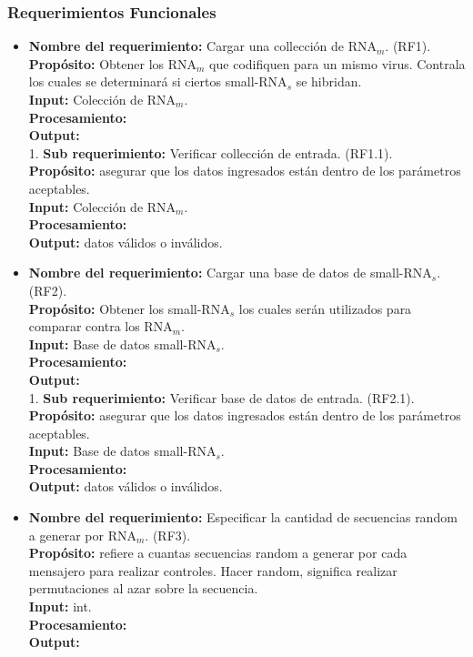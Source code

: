 \documentclass[12pt,a4paper,spanish]{article}
\begin{document}
	\subsubsection{Requerimientos Funcionales}
	\begin{itemize}
		\item \textbf{Nombre del requerimiento:} Cargar una collección de RNA$_m$. (RF1).\\
 	    \textbf{Propósito:} Obtener los RNA$_m$ que codifiquen para un mismo virus. Contrala los cuales se determinará si ciertos small-RNA$_s$ 								se hibridan.\\
		\textbf{Input:} Colección de RNA$_m$.\\
		\textbf{Procesamiento:} \\
		\textbf{Output:} \\

		1. \textbf{Sub requerimiento:} Verificar collección de entrada. (RF1.1).\\
 	    \textbf{Propósito:} asegurar que los datos ingresados están dentro de los parámetros aceptables. \\						
		\textbf{Input:} Colección de RNA$_m$.\\
		\textbf{Procesamiento:} \\
		\textbf{Output:} datos válidos o inválidos.\\

		\item \textbf{Nombre del requerimiento:} Cargar una base de datos de small-RNA$_s$. (RF2).\\
 	    \textbf{Propósito:} Obtener los small-RNA$_s$ los cuales serán utilizados para comparar contra los RNA$_m$.\\
		\textbf{Input:} Base de datos small-RNA$_s$.\\
		\textbf{Procesamiento:} \\
		\textbf{Output:} \\

		1. \textbf{Sub requerimiento:} Verificar base de datos de entrada. (RF2.1).\\
 	    \textbf{Propósito:} asegurar que los datos ingresados están dentro de los parámetros aceptables. \\						
		\textbf{Input:} Base de datos small-RNA$_s$.\\
		\textbf{Procesamiento:} \\
		\textbf{Output:} datos válidos o inválidos.\\

		\item \textbf{Nombre del requerimiento:} Especificar la cantidad de secuencias random a generar por RNA$_m$. (RF3).\\
 	    \textbf{Propósito:} refiere a cuantas secuencias random a generar por cada mensajero para realizar controles. Hacer random, significa realizar 								permutaciones al azar sobre la secuencia. \\														
		\textbf{Input:} int.\\
		\textbf{Procesamiento:} \\
		\textbf{Output:} \\


\end{itemize}
\end{document}
